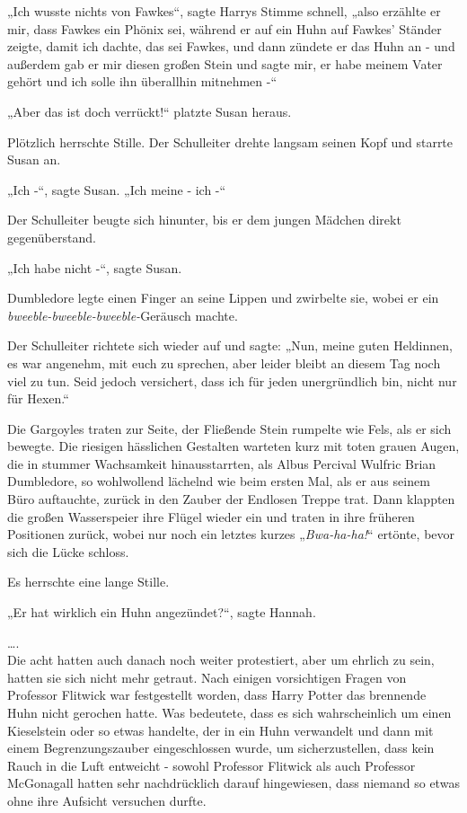{„Ich wusste nichts von Fawkes“, sagte Harrys Stimme schnell, „also erzählte er mir, dass Fawkes ein Phönix sei, während er auf ein Huhn auf Fawkes' Ständer zeigte, damit ich dachte, das sei Fawkes, und dann zündete er das Huhn an - und außerdem gab er mir diesen großen Stein und sagte mir, er habe meinem Vater gehört und ich solle ihn überallhin mitnehmen -“

„Aber das ist doch verrückt!“ platzte Susan heraus.

Plötzlich herrschte Stille. Der Schulleiter drehte langsam seinen Kopf und starrte Susan an.

„Ich -“, sagte Susan. „Ich meine - ich -“

Der Schulleiter beugte sich hinunter, bis er dem jungen Mädchen direkt gegenüberstand.

„Ich habe nicht -“, sagte Susan.

Dumbledore legte einen Finger an seine Lippen und zwirbelte sie, wobei er ein \emph{bweeble-bweeble-bweeble-}Geräusch machte.

Der Schulleiter richtete sich wieder auf und sagte: „Nun, meine guten Heldinnen, es war angenehm, mit euch zu sprechen, aber leider bleibt an diesem Tag noch viel zu tun. Seid jedoch versichert, dass ich für jeden unergründlich bin, nicht nur für Hexen.“

Die Gargoyles traten zur Seite, der Fließende Stein rumpelte wie Fels, als er sich bewegte. Die riesigen hässlichen Gestalten warteten kurz mit toten grauen Augen, die in stummer Wachsamkeit hinausstarrten, als Albus Percival Wulfric Brian Dumbledore, so wohlwollend lächelnd wie beim ersten Mal, als er aus seinem Büro auftauchte, zurück in den Zauber der Endlosen Treppe trat. Dann klappten die großen Wasserspeier ihre Flügel wieder ein und traten in ihre früheren Positionen zurück, wobei nur noch ein letztes kurzes „\emph{Bwa-ha-ha!}“ ertönte, bevor sich die Lücke schloss.

Es herrschte eine lange Stille.

„Er hat wirklich ein Huhn angezündet?“, sagte Hannah.

….\\ Die acht hatten auch danach noch weiter protestiert, aber um ehrlich zu sein, hatten sie sich nicht mehr getraut. Nach einigen vorsichtigen Fragen von Professor Flitwick war festgestellt worden, dass Harry Potter das brennende Huhn nicht gerochen hatte. Was bedeutete, dass es sich wahrscheinlich um einen Kieselstein oder so etwas handelte, der in ein Huhn verwandelt und dann mit einem Begrenzungszauber eingeschlossen wurde, um sicherzustellen, dass kein Rauch in die Luft entweicht - sowohl Professor Flitwick als auch Professor McGonagall hatten sehr nachdrücklich darauf hingewiesen, dass niemand so etwas ohne ihre Aufsicht versuchen durfte.

}
